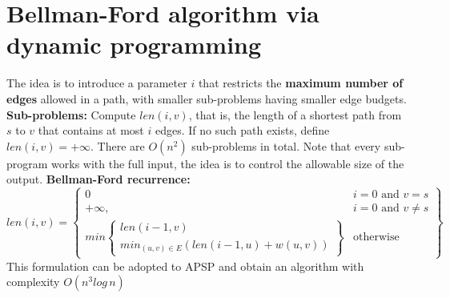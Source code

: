 \section{Bellman-Ford algorithm via dynamic programming}
The idea is to introduce a parameter $i$ that restricts the \textbf{maximum number of edges} allowed in a path, with smaller sub-problems having smaller edge budgets.\newline\newline
\textbf{Sub-problems:}\newline
Compute $len(i, v)$, that is, the length of a shortest path from $s$ to $v$ that contains at most $i$ edges. If no such path exists, define $len(i, v) = + \infty$. There are $O(n^2)$ sub-problems in total. Note that every sub-program works with the full input, the idea is to control the allowable size of the output.\newline\newline
\textbf{Bellman-Ford recurrence:}
\[
len(i, v) = \left\{\begin{array}{lr}
        0 & i = 0 \,\, \text{and} \,\, v = s\\
        +\infty, & i = 0 \,\, \text{and} \,\, v \neq s\\

        min \left\{\begin{array}{lr}
             len(i - 1, v) \\
             min_{(u, v) \in E}(len(i - 1, u) + w(u, v))
        \end{array}\right\} & \text{otherwise}
        
        \end{array}\right\}
\]
This formulation can be adopted to APSP and obtain an algorithm with complexity $O(n^3log\,n)$
